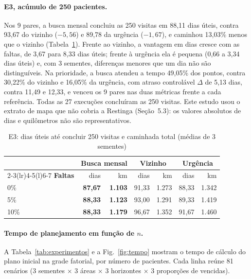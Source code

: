 \documentclass[11pt,a4paper]{article}
\begin{document}
\paragraph{E3, acúmulo de 250 pacientes.} Nos 9 pares, a busca mensal concluiu as 250 visitas em 88,11 dias úteis, contra 93,67 do vizinho ($-5{,}56$) e 89,78 da urgência ($-1{,}67$), e caminhou 13,03\% menos que o vizinho (Tabela~\ref{tab:longo}). Frente ao vizinho, a vantagem em dias cresce com as faltas, de 3,67 para 8,33 dias úteis; frente à urgência ela é pequena (0,66 a 3,34 dias úteis) e, com 3 sementes, diferenças menores que um dia não são distinguíveis. Na prioridade, a busca atendeu a tempo 49,05\% dos pontos, contra 30,22\% do vizinho e 16,05\% da urgência, com atraso controlável $\Delta$ de 5,13 dias, contra 11,49 e 12,33, e venceu os 9 pares nas duas métricas frente a cada referência. Todas as 27 execuções concluíram as 250 visitas. Este estudo usou o extrato de mapa que não cobria a Restinga (Seção~5.3): os valores absolutos de dias e quilômetros não são representativos.

\begin{table}[ht]
\centering
\caption{E3: dias úteis até concluir 250 visitas e caminhada total (médias de 3 sementes)}
\label{tab:longo}
\begin{tabular}{@{}lrrrrrr@{}}
\toprule
& \multicolumn{2}{c}{\textbf{Busca mensal}} & \multicolumn{2}{c}{\textbf{Vizinho}} & \multicolumn{2}{c}{\textbf{Urgência}} \\
\cmidrule(lr){2-3}\cmidrule(lr){4-5}\cmidrule(l){6-7}
\textbf{Faltas} & dias & km & dias & km & dias & km \\
\midrule
0\% & \textbf{87,67} & \textbf{1.103} & 91,33 & 1.273 & 88,33 & 1.342 \\
5\% & \textbf{88,33} & \textbf{1.123} & 93,00 & 1.291 & 89,33 & 1.419 \\
10\% & \textbf{88,33} & \textbf{1.179} & 96,67 & 1.352 & 91,67 & 1.460 \\
\bottomrule
\end{tabular}
\end{table}

\paragraph{Tempo de planejamento em função de $n$.} A Tabela~\ref{tab:experimentos} e a Fig.~\ref{fig:tempo} mostram o tempo de cálculo do plano inicial na grade fatorial, por número de pacientes. Cada linha reúne 81 cenários (3 sementes $\times$ 3 áreas $\times$ 3 horizontes $\times$ 3 proporções de vencidas).
\end{document}
